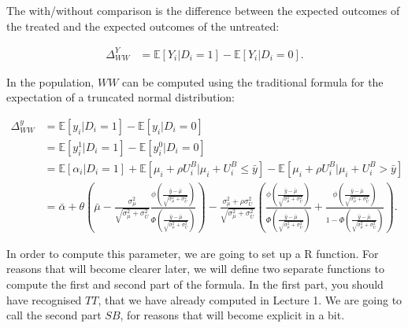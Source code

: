 \documentclass[]{book}
\newcommand{\esp}[1]{\mathbb{E}[ #1 ]}
\theoremstyle{definition}
\theoremstyle{definition}
\theoremstyle{definition}
\theoremstyle{remark}
\let\BeginKnitrBlock\begin \let\EndKnitrBlock\end
\begin{document}
\BeginKnitrBlock{definition}[With/without comparison]
\protect\hypertarget{def:unnamed-chunk-14}{}{\label{def:unnamed-chunk-14} \iffalse (With/without comparison) \fi{} }The with/without comparison is the difference between the expected outcomes of the treated and the expected outcomes of the untreated:

\begin{align*}
\Delta^Y_{WW} & =  \esp{Y_i|D_i=1}-\esp{Y_i|D_i=0}.
\end{align*}
\EndKnitrBlock{definition}

\BeginKnitrBlock{example}
\protect\hypertarget{exm:unnamed-chunk-15}{}{\label{exm:unnamed-chunk-15} }In the population, \(WW\) can be computed using the traditional formula for the expectation of a truncated normal distribution:

\begin{align*}
\Delta^y_{WW} & = \esp{y_i|D_i=1}-\esp{y_i|D_i=0} \\
              & = \esp{y_i^1|D_i=1}-\esp{y^0_i|D_i=0} \\
              & = \esp{\alpha_i|D_i=1}+\esp{\mu_i+\rho U_i^B|\mu_i+U_i^B\leq\bar{y}}-\esp{\mu_i+\rho U_i^B|\mu_i+U_i^B>\bar{y}} \\
              & = \bar{\alpha}+\theta\left(\bar{\mu}-\frac{\sigma^2_{\mu}}{\sqrt{\sigma^2_{\mu}+\sigma^2_{U}}}\frac{\phi\left(\frac{\bar{y}-\bar{\mu}}{\sqrt{\sigma^2_{\mu}+\sigma^2_{U}}}\right)}{\Phi\left(\frac{\bar{y}-\bar{\mu}}{\sqrt{\sigma^2_{\mu}+\sigma^2_{U}}}\right)}\right)  
              -\frac{\sigma^2_{\mu}+\rho\sigma^2_{U}}{\sqrt{\sigma^2_{\mu}+\sigma^2_{U}}}\left(\frac{\phi\left(\frac{\bar{y}-\bar{\mu}}{\sqrt{\sigma^2_{\mu}+\sigma^2_{U}}}\right)}{\Phi\left(\frac{\bar{y}-\bar{\mu}}{\sqrt{\sigma^2_{\mu}+\sigma^2_{U}}}\right)}+\frac{\phi\left(\frac{\bar{y}-\bar{\mu}}{\sqrt{\sigma^2_{\mu}+\sigma^2_{U}}}\right)}{1-\Phi\left(\frac{\bar{y}-\bar{\mu}}{\sqrt{\sigma^2_{\mu}+\sigma^2_{U}}}\right)}\right).
\end{align*}
\EndKnitrBlock{example}

In order to compute this parameter, we are going to set up a R function.
For reasons that will become clearer later, we will define two separate functions to compute the first and second part of the formula.
In the first part, you should have recognised \(TT\), that we have already computed in Lecture 1.
We are going to call the second part \(SB\), for reasons that will become explicit in a bit.
\end{document}
